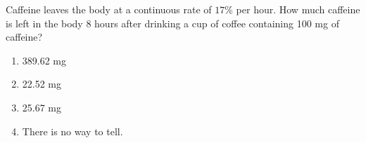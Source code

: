 \bigskip

\item
Caffeine leaves the body at a continuous rate of $17\%$ per hour.  How much caffeine is left in the body 8 hours after drinking a cup of coffee containing 100 mg of caffeine?

\begin{enumerate}
\item 389.62 mg
\item 22.52 mg
\item 25.67 mg
\item There is no way to tell.
\end{enumerate}

